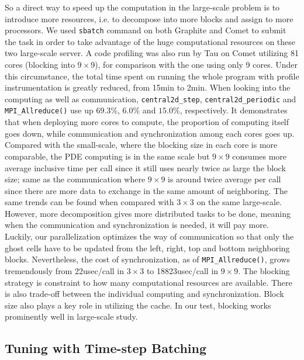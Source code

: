 \documentclass{article}
\begin{document}
So a direct way to speed up the computation in the large-scale problem is to introduce more resources, i.e. to decompose into more blocks and assign to more processors. We used \texttt{sbatch} command on both Graphite and Comet to submit the task in order to take advantage of the huge computational resources on these two large-scale server. A code profiling was also run by Tau on Comet utilizing 81 cores (blocking into $9\times9$), for comparison with the one using only 9 cores. Under this circumstance, the total time spent on running the whole program with profile instrumentation is greatly reduced, from 15min to 2min. When looking into the computing as well as communication, \texttt{central2d\_step}, \texttt{central2d\_periodic} and  \texttt{MPI\_Allreduce()} use up $69.3\%$, $6.0\%$ and $15.0\%$, respectively. It demonstrates that when deploying more cores to compute, the proportion of computing itself goes down, while communication and synchronization among each cores goes up. Compared with the small-scale, where the blocking size in each core is more comparable, the PDE computing is in the same scale but $9\times9$ consumes more average inclusive time per call since it still uses nearly twice as large the block size; same as the communication where $9\times9$ is around twice average per call since there are more data to exchange in the same amount of neighboring. The same trends can be found when compared with $3\times3$ on the same large-scale. However, more decomposition gives more distributed tasks to be done, meaning when the communication and synchronization is needed, it will pay more. Luckily, our parallelization optimizes the way of communication so that only the ghost cells have to be updated from the left, right, top and bottom neighboring blocks. Nevertheless, the cost of synchronization, as of \texttt{MPI\_Allreduce()}, grows tremendously from 22usec/call in $3\times3$ to 18823usec/call in $9\times9$. The blocking strategy is constraint to how many computational resources are available. There is also trade-off between the individual computing and synchronization. Block size also plays a key role in utilizing the cache. In our test, blocking works prominently well in large-scale study.

\subsection{Tuning with Time-step Batching}
\end{document}
